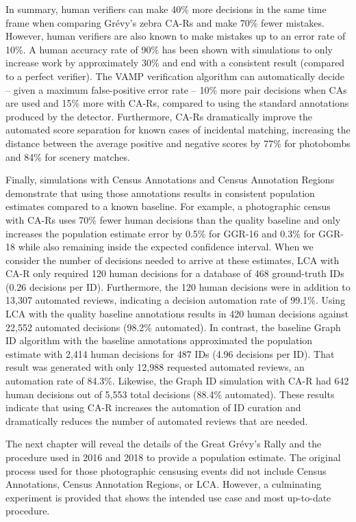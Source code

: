 In summary, human verifiers can make 40\% more decisions in the same time frame when comparing Gr\'evy's zebra CA-Rs and make 70\% fewer mistakes. However, human verifiers are also known to make mistakes up to an error rate of 10\%.  A human accuracy rate of 90\% has been shown with simulations to only increase work by approximately 30\% and end with a consistent result (compared to a perfect verifier).  The VAMP verification algorithm can automatically decide -- given a maximum false-positive error rate -- 10\% more pair decisions when CAs are used and 15\% more with CA-Rs, compared to using the standard annotations produced by the detector.  Furthermore, CA-Rs dramatically improve the automated score separation for known cases of incidental matching, increasing the distance between the average positive and negative scores by 77\% for photobombs and 84\% for scenery matches.

Finally, simulations with Census Annotations and Census Annotation Regions demonstrate that using those annotations results in consistent population estimates compared to a known baseline. For example, a photographic census with CA-Rs uses 70\% fewer human decisions than the quality baseline and only increases the population estimate error by 0.5\% for GGR-16 and 0.3\% for GGR-18 while also remaining inside the expected confidence interval.  When we consider the number of decisions needed to arrive at these estimates, LCA with CA-R only required 120 human decisions for a database of 468 ground-truth IDs (0.26 decisions per ID).  Furthermore, the 120 human decisions were in addition to 13,307 automated reviews, indicating a decision automation rate of 99.1\%.  Using LCA with the quality baseline annotations results in 420 human decisions against 22,552 automated decisions (98.2\% automated).  In contrast, the baseline Graph ID algorithm with the baseline annotations approximated the population estimate with 2,414 human decisions for 487 IDs (4.96 decisions per ID).  That result was generated with only 12,988 requested automated reviews, an automation rate of 84.3\%.  Likewise, the Graph ID simulation with CA-R had 642 human decisions out of 5,553 total decisions (88.4\% automated).  These results indicate that using CA-R increases the automation of ID curation and dramatically reduces the number of automated reviews that are needed.

The next chapter will reveal the details of the Great Gr\'evy's Rally and the procedure used in 2016 and 2018 to provide a population estimate.  The original process used for those photographic censusing events did not include Census Annotations, Census Annotation Regions, or LCA. However, a culminating experiment is provided that shows the intended use case and most up-to-date procedure.
